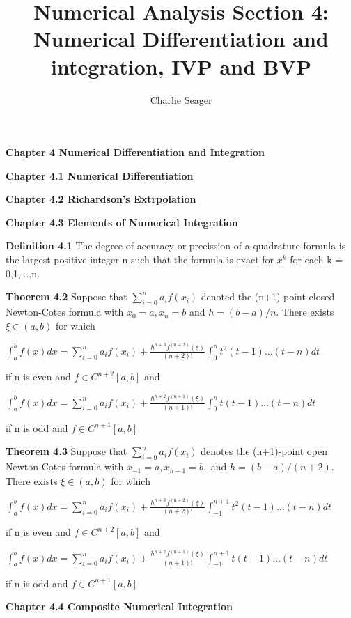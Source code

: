 \documentclass{article}
\begin{document}
\title{Numerical Analysis Section 4: Numerical Differentiation and integration, IVP and BVP} 
\author{Charlie Seager}

\maketitle

\textbf {Chapter 4 Numerical Differentiation and Integration}

\textbf {Chapter 4.1 Numerical Differentiation}

\textbf {Chapter 4.2 Richardson's Extrpolation}

\textbf {Chapter 4.3 Elements of Numerical Integration}

\textbf {Definition 4.1} The degree of accuracy or precission of a quadrature formula is the largest positive integer n such that the formula is exact for $x^k$ for each k = 0,1,...,n.

\textbf {Thoerem 4.2} Suppose that $\sum_{i=0}^n a_i f(x_i)$ denoted the (n+1)-point closed Newton-Cotes formula with $x_0 = a, x_n = b$ and $h = (b-a)/n$. There exists $\xi \in (a,b)$ for which
\begin{center}
$\int_a^b f(x) dx = \sum_{i=0}^n a_i f(x_i) + \frac{h^{n+3} f^{(n+2)}(\xi)}
{(n+2)!} \int_0^n t^2(t-1) \dots (t-n) dt$
\end{center}
if n is even and $f \in C^{n+2}[a,b]$ and 
\begin{center}
$\int_a^b f(x) dx = \sum_{i=0}^n a_i f(x_i) + \frac {h^{n+2} f^{(n+1)}(\xi)}
{(n+1)!} \int_0^n t(t-1) \dots (t-n) dt$
\end{center}

if n is odd and $f \in C^{n+1}[a,b]$

\textbf {Theorem 4.3} Suppose that $\sum_{i=0}^{n} a_i f(x_i)$ denotes the (n+1)-point open Newton-Cotes formula with $x_{-1} = a, x_{n+1} = b,$ and $h = (b-a)/(n+2)$. There exists $\xi \in (a,b)$ for which 
\begin{center}
$\int_a^b f(x) dx = \sum_{i=0}^n a_i f(x_i) + \frac{h^{n+3} f^{(n+2)} (\xi)}{(n+2)!} \int_{-1}^{n+1} t^2(t-1) \dots (t-n)dt $
\end{center}
if n is even and $f \in C^{n+2}[a,b]$ and 
\begin{center}
$\int_a^b f(x) dx = \sum_{i=0}^n a_i f(x_i) + \frac{h^{n+2} f^{(n+1)} (\xi)}{(n+1)!} \int_{-1}^{n+1} t(t-1) \dots (t-n) dt$
\end{center}
if n is odd and $f \in C^{n+1}[a,b]$

\textbf {Chapter 4.4 Composite Numerical Integration}
\end{document}
